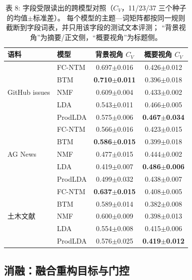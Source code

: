 \documentclass{article}
\begin{document}
\begin{table}[t]
\centering
\caption{表 8: 字段受限读出的跨模型对照（$C_V$，11/23/37 三个种子的均值$\pm$标准差）。
每个模型的主题—词矩阵都按同一规则截断到字段词表，并只用该字段的测试文本评测；
“背景视角”为摘要/正文侧，“概要视角”为标题侧。}
\label{tab:fieldview}
\label{tab:fieldview-baselines}
\small
\setlength{\tabcolsep}{4pt}
\begin{tabular}{@{}llcc@{}}
\toprule
语料 & 模型 & 背景视角 $C_V$ & 概要视角 $C_V$ \\
\midrule
\multirow{5}{*}{GitHub issues}
 & FC-NTM & 0.697$\pm$0.016 & 0.426$\pm$0.012 \\
 & BTM & \textbf{0.710$\pm$0.011} & 0.396$\pm$0.018 \\
 & NMF & 0.609$\pm$0.004 & 0.433$\pm$0.002 \\
 & LDA & 0.543$\pm$0.011 & 0.466$\pm$0.005 \\
 & ProdLDA & 0.575$\pm$0.006 & \textbf{0.467$\pm$0.034} \\
\midrule
\multirow{5}{*}{AG News}
 & FC-NTM & 0.566$\pm$0.016 & 0.423$\pm$0.015 \\
 & BTM & \textbf{0.586$\pm$0.015} & 0.399$\pm$0.018 \\
 & NMF & 0.477$\pm$0.015 & 0.444$\pm$0.002 \\
 & LDA & 0.419$\pm$0.007 & \textbf{0.486$\pm$0.006} \\
 & ProdLDA & 0.499$\pm$0.032 & 0.438$\pm$0.007 \\
\midrule
\multirow{5}{*}{土木文献}
 & FC-NTM & \textbf{0.637$\pm$0.015} & 0.408$\pm$0.005 \\
 & BTM & 0.589$\pm$0.014 & 0.382$\pm$0.008 \\
 & NMF & 0.600$\pm$0.009 & 0.398$\pm$0.013 \\
 & LDA & 0.554$\pm$0.008 & 0.415$\pm$0.006 \\
 & ProdLDA & 0.576$\pm$0.025 & \textbf{0.419$\pm$0.012} \\
\bottomrule
\end{tabular}
\end{table}

\subsection{消融：融合重构目标与门控}
\label{sec:fusion-ablation}
\end{document}
